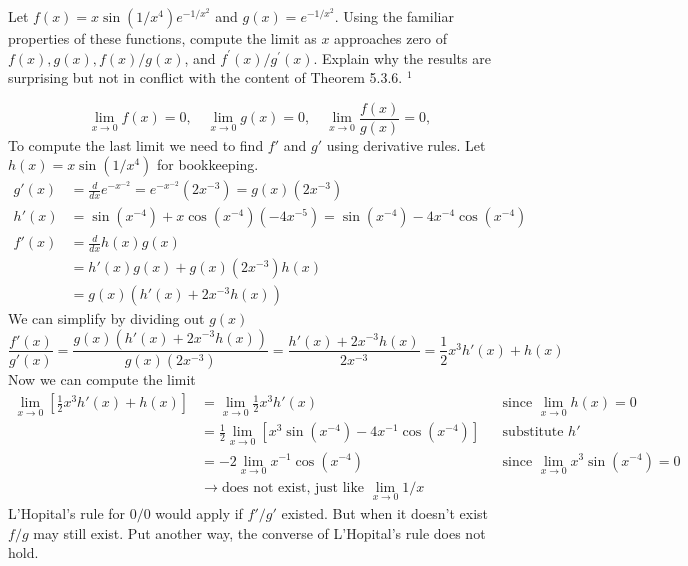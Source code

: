 \begin{exercise}
  Let $f(x)=x \sin \left(1 / x^{4}\right) e^{-1 / x^{2}}$ and $g(x)=e^{-1 / x^{2}}$. Using the familiar properties of these functions, compute the limit as $x$ approaches zero of $f(x), g(x), f(x) / g(x)$, and $f^{\prime}(x) / g^{\prime}(x)$. Explain why the results are surprising but not in conflict with the content of Theorem 5.3.6. ${ }^{1}$
\end{exercise}
\begin{solution}
  $$
  \lim_{x \to 0} f(x) = 0,
  \quad \lim_{x \to 0} g(x) = 0,
  \quad \lim_{x \to 0} \frac{f(x)}{g(x)} = 0,
  $$
  To compute the last limit we need to find $f'$ and $g'$ using derivative rules. Let $h(x) = x\sin(1/x^4)$ for bookkeeping.
  $$
  \begin{aligned}
    g'(x) &= \frac{d}{dx} e^{-x^{-2}} = e^{-x^{-2}}(2x^{-3}) = g(x)(2x^{-3}) \\
    h'(x) &= \sin(x^{-4}) + x\cos(x^{-4})(-4x^{-5}) = \sin(x^{-4}) - 4x^{-4}\cos(x^{-4})\\
    f'(x) &= \frac{d}{dx} h(x)g(x) \\
          &= h'(x)g(x) + g(x)(2x^{-3})h(x) \\
          &= g(x)(h'(x) + 2x^{-3}h(x))
  \end{aligned}
  $$
  We can simplify by dividing out $g(x)$
  $$
  \frac{f'(x)}{g'(x)}
  = \frac{g(x)(h'(x) + 2x^{-3}h(x))}{g(x)(2x^{-3})}
  = \frac{h'(x) + 2x^{-3}h(x)}{2x^{-3}}
  = \frac 12 x^3h'(x) + h(x)
  $$
  Now we can compute the limit
  $$
  \begin{aligned}
  \lim_{x \to 0}\left[\frac 12 x^3 h'(x) + h(x)\right]
  &= \lim_{x \to 0} \frac 12 x^3 h'(x) &&{\text{since } \lim_{x\to 0} h(x) = 0} \\
  &= \frac 12 \lim_{x \to 0}\left[x^3\sin(x^{-4}) - 4x^{-1}\cos(x^{-4})\right] &&{\text{substitute } h'} \\
  &= -2 \lim_{x \to 0} x^{-1}\cos(x^{-4}) &&{\text{since } \lim_{x \to 0} x^3\sin(x^{-4}) = 0} \\
  &\to \text{does not exist, just like } \lim_{x \to 0} 1/x
  \end{aligned}
  $$
  L'Hopital's rule for $0/0$ would apply if $f'/g'$ existed. But when it doesn't exist $f/g$ may still exist. Put another way, the converse of L'Hopital's rule does not hold.
\end{solution}


